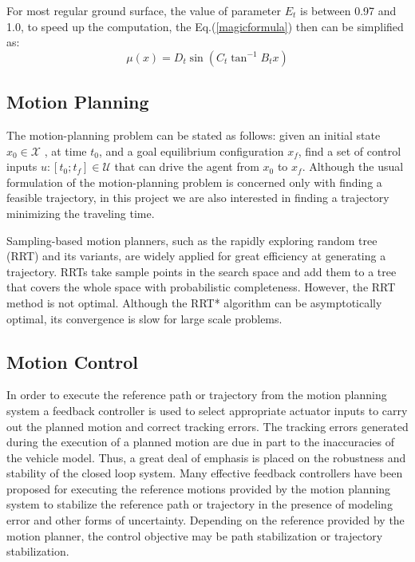 \documentclass[conference, onecolumn]{IEEEtran}
\begin{document}
For most regular ground surface, the value of parameter $E_t$ is between 0.97 and 1.0\cite{matlabvehicldocumentation}, to speed up the computation, the Eq.(\ref{magicformula}) then can be simplified as:  
\begin{equation}\label{simplemagicformula}	
	\mu(x)=D_t\sin\left(C_t\tan^{-1}B_tx\right)
\end{equation}

\subsection{Motion Planning}
The motion-planning problem can be stated as follows: given an initial state $x_0 \in \mathcal{X}$ , at time $t_0$, and a goal equilibrium configuration $x_f$, find a set of control inputs $ u:[t_0; t_f] \in \mathcal{U}$ that can drive the agent from $x_0$ to $x_f$. Although the usual formulation of the motion-planning problem is concerned only with finding a feasible trajectory, in this project we are also interested in finding a trajectory minimizing the traveling time.

Sampling-based motion planners, such as the rapidly exploring random tree (RRT) and its variants, are widely
applied for great efficiency at generating a trajectory.
RRTs take sample points in the search space and add them
to a tree that covers the whole space with probabilistic
completeness. However, the RRT method is not optimal.
Although the RRT* algorithm can be asymptotically
optimal, its convergence is slow for large scale problems. 

\subsection{Motion Control}
In order to execute the reference path or trajectory from the motion planning system a feedback controller is used to select appropriate actuator inputs to carry out the planned motion and correct tracking errors. The tracking errors generated during the execution of a planned motion are due in part to the inaccuracies of the vehicle model. Thus, a great deal of emphasis is placed on the robustness and stability of the closed
loop system.
Many effective feedback controllers have been proposed
for executing the reference motions provided by the motion planning system to stabilize the reference path or trajectory in the presence of modeling error and other forms of uncertainty. Depending on the reference provided by the motion planner, the control objective may be path stabilization or trajectory stabilization.
\end{document}

